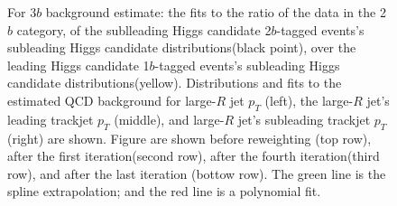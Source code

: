 \begin{figure}[htbp!]
\begin{center}
\caption{For 3$b$ background estimate: the fits to the ratio of the data in the 2$b$ category, of the sublleading Higgs candidate 2$b$-tagged events's subleading Higgs candidate distributions(black point), over the leading Higgs candidate 1$b$-tagged events's subleading Higgs candidate distributions(yellow). Distributions and fits to the estimated QCD background for large-$R$ jet $p_{T}$ (left),  the large-$R$ jet's leading trackjet $p_T$ (middle), and large-$R$ jet's subleading trackjet $p_T$ (right) are shown.  Figure are shown before reweighting (top row), after the first iteration(second row), after the fourth iteration(third row), and after the last iteration (bottow row). The green line is the spline extrapolation; and the red line is a polynomial fit.}
\label{fig:rw-3b-lead}
\end{center}
\end{figure}

